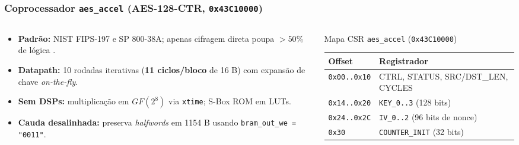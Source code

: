 \begin{frame}
  \frametitle{Coprocessador \texttt{aes\_accel} (AES-128-CTR, \texttt{0x43C10000})}
  \begin{columns}[T]
    \begin{column}{.48\textwidth}
      \begin{itemize}
        \item \textbf{Padr\~ao:} NIST FIPS-197 e SP 800-38A; apenas cifragem direta poupa $>50\%$ de l\'ogica \autocite{NISTFIPS197,NISTSP80038A}.
        \item \textbf{Datapath:} 10 rodadas iterativas (\textbf{11 ciclos/bloco} de 16 B) com expans\~ao de chave \textit{on-the-fly}.
        \item \textbf{Sem DSPs:} multiplica\c{c}\~ao em $GF(2^8)$ via \texttt{xtime}; S-Box ROM em LUTs.
        \item \textbf{Cauda desalinhada:} preserva \textit{halfwords} em 1154 B usando \texttt{bram\_out\_we = "0011"}.
      \end{itemize}
    \end{column}
    \begin{column}{.48\textwidth}
      \begin{block}{Mapa CSR \texttt{aes\_accel} (\texttt{0x43C10000})}
        \scriptsize
        \begin{tabular}{@{}ll@{}}
          \toprule
          \textbf{Offset} & \textbf{Registrador}\\
          \midrule
          \texttt{0x00..0x10} & CTRL, STATUS, SRC/DST\_LEN, CYCLES\\
          \texttt{0x14..0x20} & \texttt{KEY\_0..3} (128 bits)\\
          \texttt{0x24..0x2C} & \texttt{IV\_0..2} (96 bits de nonce)\\
          \texttt{0x30} & \texttt{COUNTER\_INIT} (32 bits)\\
          \bottomrule
        \end{tabular}
      \end{block}
    \end{column}
  \end{columns}
\end{frame}

